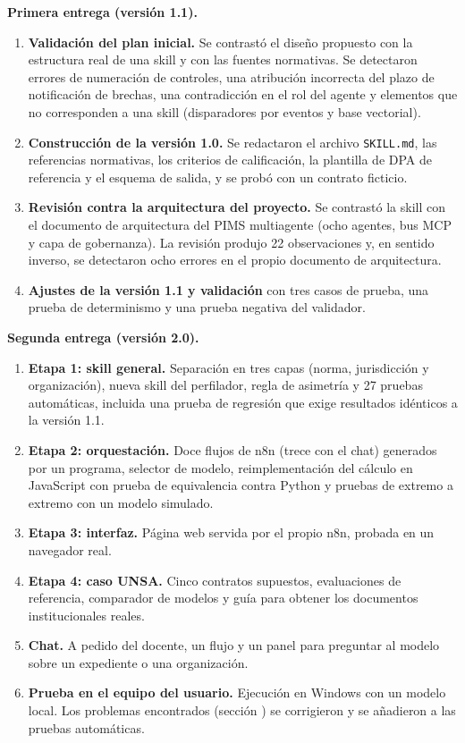 \documentclass[12pt,letterpaper]{article}
\begin{document}
\par\noindent\textbf{Primera entrega (versión 1.1).}
\begin{enumerate}
  \item \textbf{Validación del plan inicial.} Se contrastó el diseño propuesto con la estructura real de una skill y con las fuentes normativas. Se detectaron errores de numeración de controles, una atribución incorrecta del plazo de notificación de brechas, una contradicción en el rol del agente y elementos que no corresponden a una skill (disparadores por eventos y base vectorial).
  \item \textbf{Construcción de la versión 1.0.} Se redactaron el archivo \texttt{SKILL.md}, las referencias normativas, los criterios de calificación, la plantilla de DPA de referencia y el esquema de salida, y se probó con un contrato ficticio.
  \item \textbf{Revisión contra la arquitectura del proyecto.} Se contrastó la skill con el documento de arquitectura del PIMS multiagente (ocho agentes, bus MCP y capa de gobernanza). La revisión produjo 22 observaciones y, en sentido inverso, se detectaron ocho errores en el propio documento de arquitectura.
  \item \textbf{Ajustes de la versión 1.1 y validación} con tres casos de prueba, una prueba de determinismo y una prueba negativa del validador.
\end{enumerate}

\par\noindent\textbf{Segunda entrega (versión 2.0).}
\begin{enumerate}[resume]
  \item \textbf{Etapa 1: skill general.} Separación en tres capas (norma, jurisdicción y organización), nueva skill del perfilador, regla de asimetría y 27 pruebas automáticas, incluida una prueba de regresión que exige resultados idénticos a la versión 1.1.
  \item \textbf{Etapa 2: orquestación.} Doce flujos de n8n (trece con el chat) generados por un programa, selector de modelo, reimplementación del cálculo en JavaScript con prueba de equivalencia contra Python y pruebas de extremo a extremo con un modelo simulado.
  \item \textbf{Etapa 3: interfaz.} Página web servida por el propio n8n, probada en un navegador real.
  \item \textbf{Etapa 4: caso UNSA.} Cinco contratos supuestos, evaluaciones de referencia, comparador de modelos y guía para obtener los documentos institucionales reales.
  \item \textbf{Chat.} A pedido del docente, un flujo y un panel para preguntar al modelo sobre un expediente o una organización.
  \item \textbf{Prueba en el equipo del usuario.} Ejecución en Windows con un modelo local. Los problemas encontrados (sección ) se corrigieron y se añadieron a las pruebas automáticas.
\end{enumerate}
\end{document}
